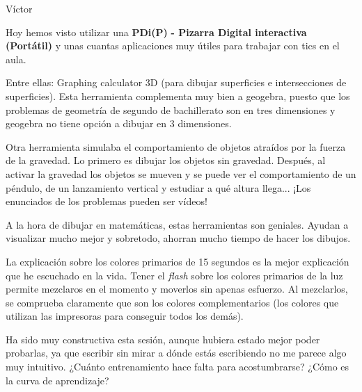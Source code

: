 \begin{opin}{\victorcolor}{Víctor}

Hoy hemos visto utilizar una \textbf{PDi(P)}\textbf{ - Pizarra Digital interactiva (Portátil)} y unas cuantas aplicaciones muy útiles para trabajar con tics en el aula.

Entre ellas: Graphing calculator 3D (para dibujar superficies e intersecciones de superficies).
%
Esta herramienta complementa muy bien a geogebra, puesto que los problemas de geometría de segundo de bachillerato son en tres dimensiones y geogebra no tiene opción a dibujar en 3 dimensiones.

Otra herramienta simulaba el comportamiento de objetos atraídos por la fuerza de la gravedad. 
%
Lo primero es dibujar los objetos sin gravedad. Después, al activar la gravedad los objetos se mueven y se puede ver el comportamiento de un péndulo, de un lanzamiento vertical y estudiar a qué altura llega... ¡Los enunciados de los problemas pueden ser vídeos!

A la hora de dibujar en matemáticas, estas herramientas son geniales. Ayudan a visualizar mucho mejor y sobretodo, ahorran mucho tiempo de hacer los dibujos.

La explicación sobre los colores primarios de 15 segundos es la mejor explicación que he escuchado en la vida. 
%
Tener el \textit{flash} sobre los colores primarios de la luz permite mezclaros en el momento y moverlos sin apenas esfuerzo. 
%
Al mezclarlos, se comprueba claramente que son los colores complementarios (los colores que utilizan las impresoras para conseguir todos los demás).

Ha sido muy constructiva esta sesión, aunque hubiera estado mejor poder probarlas, ya que escribir sin mirar a dónde estás escribiendo no me parece algo muy intuitivo. 
%
¿Cuánto entrenamiento hace falta para acostumbrarse?
%
¿Cómo es la curva de aprendizaje?


\end{opin}

